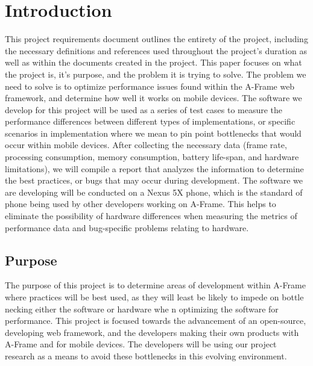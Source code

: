 \documentclass[letterpaper,10pt,titlepage,draftclsnofoot,onecolumn,compsoc,utf8,latin1]{IEEEtran}
\begin{document}
\section{Introduction}
\begin{singlespace}
\noindent
This project requirements document outlines the entirety of the project, including the necessary definitions and references used throughout the project's duration as well as within the documents created in the project. This paper focuses on what the project is, it's purpose, and the problem it is trying to solve. The problem we need to solve is to optimize performance issues found within the A-Frame web framework, and determine how well it works on mobile devices. The software we develop for this project will be used as a series of test cases to measure the performance differences between different types of implementations, or specific scenarios in implementation where we mean to pin point bottlenecks that would occur within mobile devices. After collecting the necessary data (frame rate, processing consumption, memory consumption, battery life-span, and hardware limitations), we will compile a report that analyzes the information to determine the best practices, or bugs that may occur during development. The software we are developing will be conducted on a Nexus 5X phone, which is the standard of phone being used by other developers working on A-Frame. This helps to eliminate the possibility of hardware differences when measuring the metrics of performance data and bug-specific problems relating to hardware.
\end{singlespace}

\subsection{Purpose}
\begin{singlespace}
\noindent
The purpose of this project is to determine areas of development within A-Frame where practices will be best used, as they will least be likely to impede on bottle necking either the software or hardware whe n optimizing the software for performance. This project is focused towards the advancement of an open-source, developing web framework, and the developers making their own products with A-Frame and for mobile devices. The developers will be using our project research as a means to avoid these bottlenecks in this evolving environment.
\end{singlespace}
\end{document}

